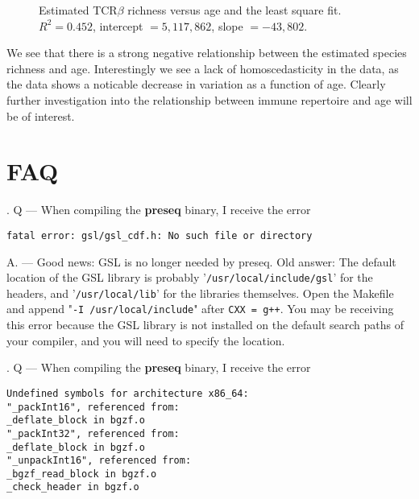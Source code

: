 \documentclass[11pt, titlepage]{article}
\newcounter{question}
\newcommand\Que[1]{%
   \leavevmode\par
   \stepcounter{question}
   \noindent
   \thequestion. Q --- #1\par}
\newcommand\Ans[1]{%
    \leavevmode\par\noindent
   {\leftskip37pt
    A. --- #1 \par }}
\newcommand{\fn}[1]{\texttt{#1}}
\newcommand{\tab}{\hspace*{2em}}
\begin{document}
 \begin{figure}[h!]
\caption{Estimated TCR$\beta$ richness versus age and the
least square fit.  $R^{2} = 0.452$, intercept $ = 5,117,862$, slope $= -43,802$.
}
\end{figure}

We see that there is a strong negative relationship between the
estimated species richness and age.  Interestingly we see a lack
of homoscedasticity in the data, as the data shows a noticable
decrease in variation as a function of age.
Clearly further investigation into the relationship between
immune repertoire and age will be of interest.



\newpage


\section{FAQ}

\Que{When compiling the \textbf{preseq} binary, I receive the error

\fn{fatal error: gsl/gsl\_cdf.h: No such file or directory
}
}

\Ans{Good news: GSL is no longer needed by preseq. Old answer: The
  default location of the GSL library is probably
  '\fn{/usr/local/include/gsl}' for the headers, and
  '\fn{/usr/local/lib}' for the libraries themselves. Open the
  Makefile and append "\fn{-I /usr/local/include}" after \fn{CXX =
    g++}.  You may be receiving this error because the GSL library is
  not installed on the default search paths of your compiler, and you
  will need to specify the location.}


\Que{When compiling the \textbf{preseq} binary, I receive the error

\fn{Undefined symbols for architecture x86\_64: ~\\
\tab"\_packInt16", referenced from:~\\
\tab\tab\_deflate\_block in bgzf.o~\\
 \tab"\_packInt32", referenced from:~\\
 \tab\tab\_deflate\_block in bgzf.o~\\
 \tab "\_unpackInt16", referenced from:~\\
   \tab\tab   \_bgzf\_read\_block in bgzf.o~\\
    \tab\tab  \_check\_header in bgzf.o~\\
}
}
\end{document}
